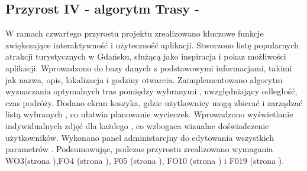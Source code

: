     \subsection{Przyrost IV - algorytm Trasy - }
    \label{sec:przyrost4}
    W ramach czwartego przyrostu projektu zrealizowano kluczowe funkcje zwiększające interaktywność i użyteczność aplikacji. \newline
    \indent Stworzono listę popularnych atrakcji turystycznych w Gdańsku, służącą jako inspiracja i pokaz możliwości aplikacji. \newline
    \indent Wprowadzono do bazy danych  z podstawowymi informacjami, takimi jak nazwa, opis, lokalizacja i godziny otwarcia. \newline
    \indent Zaimplementowano algorytm wyznaczania optymalnych tras pomiędzy wybranymi , uwzględniający odległość, czas podróży. \newline
    \indent Dodano ekran koszyka, gdzie użytkownicy mogą zbierać i zarządzać listą wybranych , co ułatwia planowanie wycieczek. \newline
    \indent Wprowadzono wyświetlanie indywidualnych zdjęć dla każdego , co wzbogaca wizualne doświadczenie użytkowników.\newline
    \indent Wykonano panel administarcjny do edytowania wszystkich parametrów .
    Podsumowując, podczas przyrostu zrealizowano wymagania WO3(strona \pageref{tab:requirements:general3}),FO4 (strona \pageref{tab:requirements:func4}), F05 (strona \pageref{tab:requirements:func5}), FO10 (strona \pageref{tab:requirements:func10}) i F019 (strona \pageref{tab:requirements:func19}).




